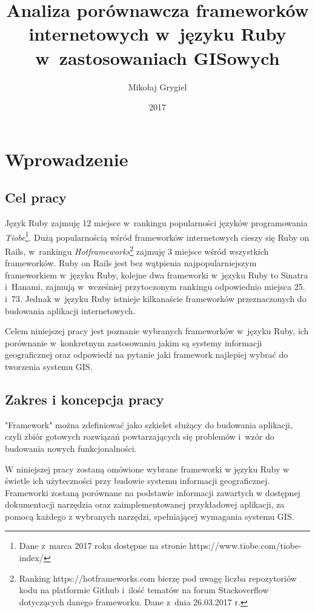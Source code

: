 \documentclass[printmode]{mgr}
\date{2017}
\title{Analiza porównawcza frameworków internetowych w~języku Ruby w~zastosowaniach GISowych}
\author{Mikołaj Grygiel}
\begin{document}


\maketitle

\tableofcontents

\chapter{Wprowadzenie}
\section{Cel pracy}
Język Ruby zajmuję 12 miejsce w~rankingu popularności języków programowania \emph{Tiobe}\footnote{Dane z~marca 2017 roku dostępne na stronie https://www.tiobe.com/tiobe-index/}. Dużą popularnością wśród frameworków internetowych cieszy się Ruby on Rails, w~rankingu \emph{Hotframeworks}\footnote{Ranking https://hotframeworks.com bierzę pod uwagę liczba repozytoriów kodu na platformie Github i~ilość tematów na forum Stackoverflow dotyczących danego frameworku. Dane z~dnia 26.03.2017 r.} zajmuję 3 miejsce wśród wszystkich frameworków. Ruby on Rails jest bez wątpienia najpopularniejszym frameworkiem w~języku Ruby, kolejne dwa frameworki w~języku Ruby to Sinatra i~Hanami, zajmują w~wcześniej przytoczonym rankingu odpowiednio miejsca 25. i~73. Jednak w~języku Ruby istnieje kilkanaście frameworków przeznaczonych do budowania aplikacji internetowych.

Celem niniejszej pracy jest poznanie wybranych frameworków w~języku Ruby, ich porównanie w~konkretnym zastosowaniu jakim są systemy informacji geograficznej oraz odpowiedź na pytanie jaki framework najlepiej wybrać do tworzenia systemu GIS.

\section{Zakres i koncepcja pracy}
"Framework" można zdefiniować jako szkielet służący do budowania aplikacji, czyli zbiór gotowych rozwiązań powtarzających się problemów i~wzór do budowania nowych funkcjonalności.\cite{framework}

W niniejszej pracy zostaną omówione wybrane frameworki w języku Ruby w świetle ich użyteczności przy budowie systemu informacji geograficznej. Frameworki zostaną porównane na podstawie informacji zawartych w dostępnej dokumentacji narzędzia oraz zaimplementowanej przykładowej aplikacji, za pomocą każdego z wybranych narzędzi, spełniającej wymagania systemu GIS.
\end{document}
